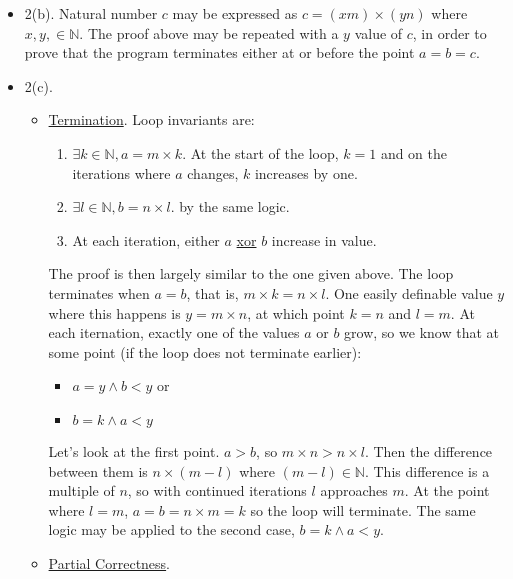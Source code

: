 \documentclass{article}
\begin{document}
\begin{itemize}
\begin{itemize}
\begin{description}
        \end{description}
    \end{itemize}
\item 2(b). Natural number $c$ may be expressed as $c = (xm) \times (yn)$ where $x, y, \in \mathbb{N}$. The proof above may be repeated with a $y$ value of $c$, in order to prove that the program terminates either at or before the point $a = b = c$.
\item 2(c).
    \begin{itemize}
    \item \underline{Termination}. Loop invariants are:
        \begin{enumerate}
        \item $\exists k \in \mathbb{N}, a = m \times k$. At the start of the loop, $k = 1$ and on the iterations where $a$ changes, $k$ increases by one.
        \item $\exists l \in \mathbb{N}, b = n \times l$. by the same logic.
        \item At each iteration, either $a$ \underline{xor} $b$ increase in value.
        \end{enumerate}
    The proof is then largely similar to the one given above. The loop terminates when $a = b$, that is, $m \times k = n \times l$. One easily definable value $y$ where this happens is $y = m \times n$, at which point $k = n$ and $l = m$. At each iternation, exactly one of the values $a$ or $b$ grow, so we know that at some point (if the loop does not terminate earlier):
        \begin{itemize}
        \item $a = y \land b < y$ or
        \item $b = k \land a < y$
        \end{itemize}
    Let's look at the first point. $a > b$, so $m \times n > n \times l$. Then the difference between them is $n \times (m - l)$ where $(m - l) \in \mathbb{N}$. This difference is a multiple of $n$, so with continued iterations $l$ approaches $m$. At the point where $l = m$, $a = b = n \times m = k$ so the loop will terminate. The same logic may be applied to the second case, $b = k \land a < y$.
    \item \underline{Partial Correctness}.
    \end{itemize}
\end{itemize}
\end{document}
